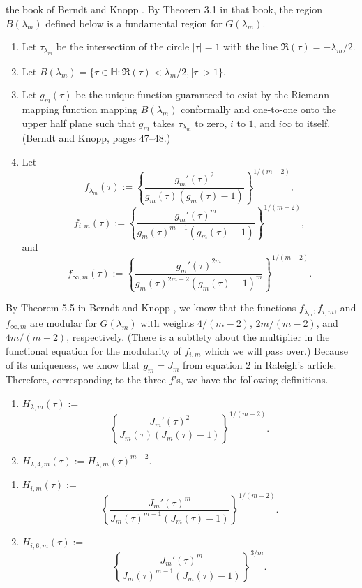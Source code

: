 \documentclass{article}
\begin{document}
the book of Berndt and Knopp 
\cite{berndt2008hecke}. 
By Theorem 3.1 in that book,
the region $B(\lambda_m)$ defined below is
a fundamental region for $G(\lambda_m)$.
\begin{definition}
\begin{enumerate}
\item Let $\tau_{\lambda_m}$ be the intersection
of the circle $|\tau| = 1$
with the line $\Re(\tau) = -\lambda_m/2$.
\item Let $B(\lambda_m)= \{\tau \in \mathbb{H}:
\Re(\tau) < \lambda_m/2,  |\tau| > 1\}$. 
\item Let $g_m(\tau)$ be the unique 
function guaranteed
to exist by the Riemann mapping function
mapping $B(\lambda_m)$ conformally
and one-to-one onto the upper half plane
such that $g_m$ takes  $\tau_{\lambda_m}$
to zero, $i$ to $1$, and $i\infty$ to itself.
(Berndt and Knopp, pages 47--48.) 
\item Let
 $$
 f_{\lambda_m}(\tau)
 :=\left \{
 \frac {g_m'(\tau)^2}
 {g_m(\tau)(g_m(\tau) -1)}
 \right \}^{1/(m-2)},
 $$
 $$
 f_{i,m}(\tau):=
 \left \{
 \frac {g_m'(\tau)^m}
 {g_m(\tau)^{m-1} (g_m(\tau) - 1)}
 \right \}^{1/(m-2)},
 $$
 and
 $$
 f_{\infty,m}(\tau) := 
 \left \{ \frac{g_m'(\tau)^{2m}}
 {g_m(\tau)^{2m-2}(g_m(\tau)-1)^m}
\right \}^{1/(m-2)}.
 $$
 \end{enumerate}
 \end{definition}
 \noindent
By Theorem 5.5 in Berndt and Knopp 
\cite{berndt2008hecke},
we know that the functions $f_{\lambda_m},
f_{i,m}$, and $f_{\infty,m}$ are modular
for $G(\lambda_m)$ with weights
$4/(m-2)$, $2m/(m-2)$, and $4m/(m-2)$,
respectively. 
(There is a
subtlety about the multiplier in
the functional equation for the
modularity of $f_{i,m}$ which we will pass over.)
\newline \newline \noindent
Because of its uniqueness,
we know that $g_m = J_m$ 
from equation 2 in Raleigh's article.
Therefore, corresponding to the three $f$'s,
we have the following definitions.
\begin{definition}
\begin{enumerate}
\item 
$H_{\lambda, m}(\tau) :=$ 
 $$\left \{
 \frac {J_m'(\tau)^2}
 {J_m(\tau)(J_m(\tau) -1)}
 \right \}^{1/(m-2)}.$$
 \item $H_{\lambda,4,m} (\tau) :=
 H_{\lambda, m}(\tau)^{m-2}.$
 \end{enumerate}
 \end{definition}
 \begin{definition}
 \begin{enumerate}
 \item 
  $H_{i,m}(\tau):=$ 
  $$
\left \{
 \frac {J_m'(\tau)^m}
 {J_m(\tau)^{m-1} (J_m(\tau) - 1)}
 \right \}^{1/(m-2)}.$$
 \item  $H_{i,6,m}(\tau):=$
  $$
\left \{
 \frac {J_m'(\tau)^m}
 {J_m(\tau)^{m-1} (J_m(\tau) - 1)}
 \right \}^{3/m}.$$
 \end{enumerate}
 \end{definition} 
\end{document}
